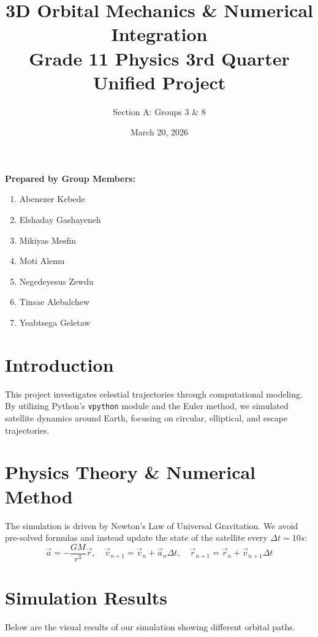 \documentclass[12pt]{article}
\title{\textbf{3D Orbital Mechanics \& Numerical Integration} \\ \large Grade 11 Physics 3rd Quarter Unified Project}
\author{Section A: Groups 3 \& 8}
\date{March 20, 2026}
\begin{document}
\maketitle

\begin{center}
\textbf{\large Prepared by Group Members:} \\[0.5cm]
    \begin{tcolorbox}[colframe=mainblue, colback=white, width=0.8\textwidth, arc=2mm, boxrule=1pt]
        \begin{enumerate}[label=\arabic*., nosep, leftmargin=3.5em]
            \item Abenezer Kebede \item Elshaday Gashayeneh
            \item Mikiyas Mesfin \item Moti Alemu
            \item Negedeyesus Zewdu \item Tinsae Alebalchew
            \item Yeabtsega Geletaw
        \end{enumerate}
    \end{tcolorbox}
\end{center}

\section{Introduction}
This project investigates celestial trajectories through computational modeling. By utilizing Python's \texttt{vpython} module and the Euler method, we simulated satellite dynamics around Earth, focusing on circular, elliptical, and escape trajectories.

\section{Physics Theory \& Numerical Method}
The simulation is driven by Newton's Law of Universal Gravitation. We avoid pre-solved formulas and instead update the state of the satellite every $\Delta t = 10s$:
\begin{equation}
\vec{a} = - \frac{G M}{r^3} \vec{r}, \quad \vec{v}_{n+1} = \vec{v}_n + \vec{a}_n \Delta t, \quad \vec{r}_{n+1} = \vec{r}_n + \vec{v}_{n+1} \Delta t
\end{equation}

\section{Simulation Results}
Below are the visual results of our simulation showing different orbital paths.
\end{document}
